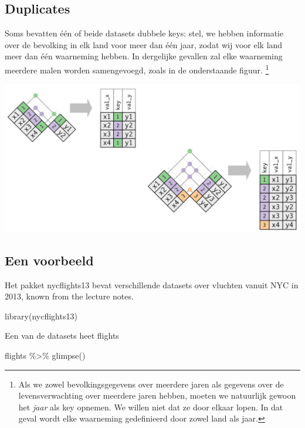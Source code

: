 \documentclass[]{tufte-book}
\newenvironment{Shaded}{}{}
\newcommand{\FunctionTok}[1]{\textcolor[rgb]{0.02,0.16,0.49}{#1}}
\newcommand{\NormalTok}[1]{#1}
\newcommand{\SpecialCharTok}[1]{\textcolor[rgb]{0.25,0.44,0.63}{#1}}
\begin{document}
\hypertarget{duplicates}{%
\subsection{Duplicates}\label{duplicates}}

Soms bevatten één of beide datasets dubbele keys: stel, we hebben informatie over de bevolking in elk land voor meer dan één jaar, zodat wij voor elk land meer dan één waarneming hebben. In dergelijke gevallen zal elke waarneming meerdere malen worden samengevoegd, zoals in de onderstaande figuur. \footnote{Als we zowel bevolkingsgegevens over meerdere jaren als gegevens over de levensverwachting over meerdere jaren hebben, moeten we natuurlijk gewoon het \emph{jaar} als key opnemen. We willen niet dat ze door elkaar lopen. In dat geval wordt elke waarneming gedefinieerd door zowel land als jaar.}

\includegraphics[width=1\linewidth]{images/join_duplicates}

\hypertarget{een-voorbeeld}{%
\subsection{Een voorbeeld}\label{een-voorbeeld}}

Het pakket nycflights13 bevat verschillende datasets over vluchten vanuit NYC in 2013, known from the lecture notes.

\begin{Shaded}
\begin{Highlighting}[]
\FunctionTok{library}\NormalTok{(nycflights13)}
\end{Highlighting}
\end{Shaded}

Een van de datasets heet flights

\begin{Shaded}
\begin{Highlighting}[]
\NormalTok{flights }\SpecialCharTok{\%\textgreater{}\%}
  \FunctionTok{glimpse}\NormalTok{()}
\end{Highlighting}
\end{Shaded}
\end{document}
